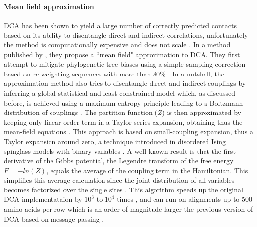 \paragraph{Mean field approximation}
DCA has been shown to yield a large number of correctly predicted contacts based on its ability to disentangle direct and indirect correlations, unfortunately the method is computationally expensive and does not scale \cite{morcos2011direct}.
In a method published by \cite{morcos2011direct}, they propose a ``mean field" approximation to DCA.
They first attempt to mitigate phylogenetic tree biases using a simple sampling correction based on re-weighting  sequences with more than $80\%$ \cite{morcos2011direct}.
In a nutshell, the approximation method also tries to disentangle direct and indirect couplings by inferring a global statistical and least-constrained model which, as discussed before, is achieved using a maximum-entropy principle leading to a Boltzmann distribution of couplings \cite{morcos2011direct}.
The partition function ($Z$) is then approximated by keeping only linear order term in a Taylor series expansion, obtaining thus the mean-field equations \cite{morcos2011direct}.
This approach is based on small-coupling expansion, thus a Taylor expansion around zero, a technique introduced in disordered Ising spinglass models with binary variables \cite{morcos2011direct}.
A well known result is that the first derivative of the Gibbs potential, the Legendre transform of the free energy $F = - ln(Z)$, equals the average of the coupling term in the Hamiltonian.
This simplifies this average calculation since the joint distribution of all variables becomes factorized over the single sites \cite{morcos2011direct}.
This algorithm speeds up the original DCA implementataion by $10^3$ to $10^4$ times \cite{morcos2011direct}, and can run on alignments up to $500$ amino acids per row which is an order of magnitude larger the previous version of DCA based on message passing \cite{morcos2011direct,weigt2009identification}.

